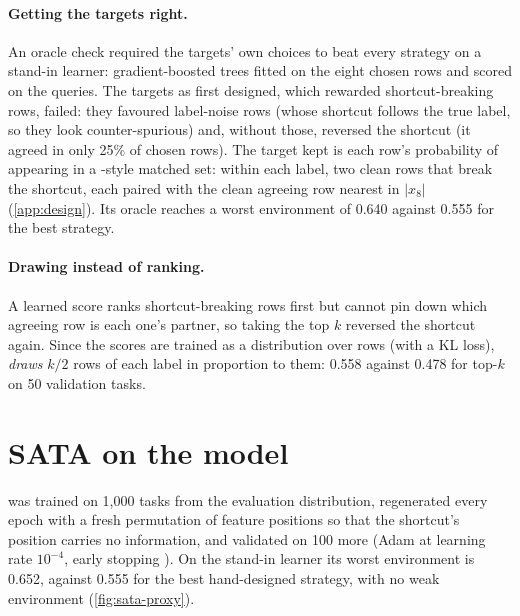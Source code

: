 \paragraph{Getting the targets right.}
\label{sec:sata-targets}
An oracle check required the targets' own choices to beat every strategy on a stand-in learner: gradient-boosted trees \citep{chen2016xgboost} fitted on the eight chosen rows and scored on the queries. The targets as first designed, which rewarded shortcut-breaking rows, failed: they favoured label-noise rows (whose shortcut follows the true label, so they look counter-spurious) and, without those, reversed the shortcut (it agreed in only 25\% of chosen rows).
The target kept is each row's probability of appearing in a -style matched set: within each label, two clean rows that break the shortcut, each paired with the clean agreeing row nearest in $|x_8|$ (\autoref{app:design}).
Its oracle reaches a worst environment of 0.640 against 0.555 for the best strategy.

\paragraph{Drawing instead of ranking.}
A learned score ranks shortcut-breaking rows first but cannot pin down which agreeing row is each one's partner, so taking the top $k$ reversed the shortcut again.
Since the scores are trained as a distribution over rows (with a KL loss), \sata \emph{draws} $k/2$ rows of each label in proportion to them: 0.558 against 0.478 for top-$k$ on 50 validation tasks.


\section{SATA on the model}
\label{sec:sata}

\sata was trained on 1,000 tasks from the evaluation distribution, regenerated every epoch with a fresh permutation of feature positions so that the shortcut's position carries no information, and validated on 100 more (Adam \citep{kingma2015adam} at learning rate $10^{-4}$, early stopping \citep{prechelt1998early}).
On the stand-in learner its worst environment is 0.652, against 0.555 for the best hand-designed strategy, with no weak environment (\autoref{fig:sata-proxy}).

